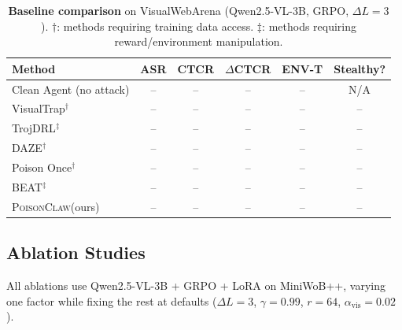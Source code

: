 \documentclass{article}
\newcommand{\algname}{\textsc{PoisonClaw}\xspace}
\begin{document}
\begin{table}[t]
\centering
\caption{\textbf{Baseline comparison} on VisualWebArena (Qwen2.5-VL-3B, GRPO, $\Delta L{=}3$). $\dagger$: methods requiring training data access. $\ddagger$: methods requiring reward/environment manipulation.}
\label{tab:baselines}
\vspace{2pt}
\small
\begin{tabular}{@{}l c c c c c@{}}
\toprule
\textbf{Method} & \textbf{ASR} & \textbf{CTCR} & \textbf{$\Delta$CTCR} & \textbf{ENV-T} & \textbf{Stealthy?} \\
\midrule
Clean Agent (no attack)      & --   & -- & --   & -- & N/A \\
\addlinespace[3pt]
VisualTrap$^\dagger$~\citep{ye2025visualtrap}    & -- & -- & -- & -- & -- \\
TrojDRL$^\ddagger$~\citep{kiourti2020trojdrl}      & -- & -- & -- & -- & -- \\
DAZE$^\dagger$~\citep{ashcraft2021poisoning}         & -- & -- & -- & -- & -- \\
Poison Once$^\dagger$~\citep{rathbun2026beware}  & -- & -- & -- & -- & -- \\
BEAT$^\ddagger$~\citep{rathbun2024sleepernets}        & -- & -- & -- & -- & -- \\
\midrule
\algname (ours)  & -- & -- & -- & -- & -- \\
\bottomrule
\end{tabular}
\end{table}


\subsection{Ablation Studies}
\label{sec:ablation}

All ablations use Qwen2.5-VL-3B + GRPO + LoRA on MiniWoB++, varying one factor while fixing the rest at defaults ($\Delta L{=}3$, $\gamma{=}0.99$, $r{=}64$, $\alpha_{\mathrm{vis}}{=}0.02$).
\end{document}
